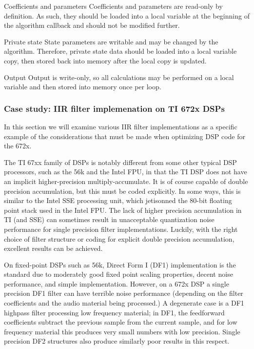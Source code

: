 \begin{DoxyItemize}
\item Coefficients and parameters  Coefficients and parameters are read-\/only by definition. As such, they should be loaded into a local variable at the beginning of the algorithm callback and should not be modified further.  


\item Private state  State parameters are writable and may be changed by the algorithm. Therefore, private state data should be loaded into a local variable copy, then stored back into memory after the local copy is updated.  


\item Output  Output is write-\/only, so all calculations may be performed on a local variable and then stored into memory once per loop.  


\end{DoxyItemize}

\hypertarget{a00832_subsection__case_study_iir_filter_implemenation_on_ti_672x_dsps}{}\subsubsection{Case study\+: I\+I\+R filter implemenation on T\+I 672x D\+S\+Ps}\label{a00832_subsection__case_study_iir_filter_implemenation_on_ti_672x_dsps}
 In this section we will examine various I\+IR filter implementations as a specific example of the considerations that must be made when optimizing D\+SP code for the 672x.

The TI 67xx family of D\+S\+Ps is notably different from some other typical D\+SP processors, such as the 56k and the Intel F\+PU, in that the TI D\+SP does not have an implicit higher-\/precision multiply-\/accumulate. It is of course capable of double precision accumulation, but this must be coded explicitly. In some ways, this is similar to the Intel S\+SE processing unit, which jetisonned the 80-\/bit floating point stack used in the Intel F\+PU. The lack of higher precision accumulation in TI (and S\+SE) can sometimes result in unacceptable quantization noise performance for single precision filter implementations. Luckily, with the right choice of filter structure or coding for explicit double precision accumulation, excellent results can be achieved.

On fixed-\/point D\+S\+Ps such as 56k, Direct Form I (D\+F1) implementation is the standard due to moderately good fixed point scaling properties, decent noise performance, and simple implementation. However, on a 672x D\+SP a single precision D\+F1 filter can have terrible noise performance (depending on the filter coefficients and the audio material being processed.) A degenerate case is a D\+F1 highpass filter processing low frequency material; in D\+F1, the feedforward coefficients subtract the previous sample from the current sample, and for low frequency material this produces very small numbers with low precision. Single precision D\+F2 structures also produce similarly poor results in this respect.

